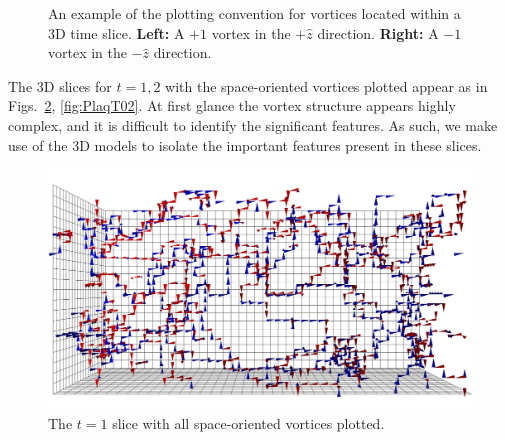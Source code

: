 {\begin{figure}[ht]
\begin{subfigure}[b]{0.3\textwidth}
  \end{subfigure}             
  \caption{An example of the plotting convention for vortices located within a 3D time slice. \textbf{Left:} A $+1$ vortex in the $+\hat{z}$ direction. \textbf{Right:} A $-1$ vortex in the $-\hat{z}$ direction.}
  \label{fig:SpacialVortices}
\end{figure}}
%
The 3D slices for $t=1,2$ with the space-oriented vortices plotted appear as in Figs.~\ref{fig:PlaqT01}, \ref{fig:PlaqT02}. At first glance the vortex structure appears highly complex, and it is difficult to identify the significant features. As such, we make use of the 3D models to isolate the important features present in these slices. 
%
{\centering
\begin{figure}[htb!]
\includegraphics[width=\linewidth]{Plaq_CFG95_T01.png}
\caption{\label{fig:PlaqT01}The $t=1$ slice with all space-oriented vortices plotted.}
\end{figure}
}
%
